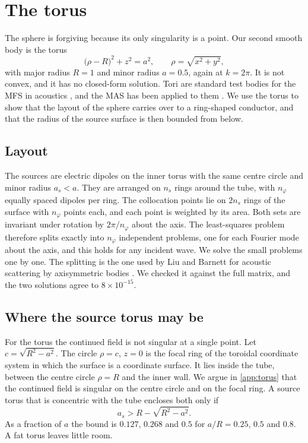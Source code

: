 \section{The torus}
\label{sec:torus}

The sphere is forgiving because its only singularity is a point. Our second smooth body is the torus
\begin{equation}
  \bigl(\rho - R\bigr)^2 + z^2 = a^2, \qquad \rho = \sqrt{x^2+y^2},
\end{equation}
with major radius $R = 1$ and minor radius $a = 0.5$, again at $k = 2\pi$. It is not convex, and it has no closed-form solution. Tori are standard test bodies for the MFS in acoustics \cite{cai2026}, and the MAS has been applied to them \cite{karkashadze1990s}. We use the torus to show that the layout of the sphere carries over to a ring-shaped conductor, and that the radius of the source surface is then bounded from below.

\subsection{Layout}

The sources are electric dipoles on the inner torus with the same centre circle and minor radius $a_s < a$. They are arranged on $n_s$ rings around the tube, with $n_\varphi$ equally spaced dipoles per ring. The collocation points lie on $2n_s$ rings of the surface with $n_\varphi$ points each, and each point is weighted by its area. Both sets are invariant under rotation by $2\pi/n_\varphi$ about the axis. The least-squares problem therefore splits exactly into $n_\varphi$ independent problems, one for each Fourier mode about the axis, and this holds for any incident wave. We solve the small problems one by one. The splitting is the one used by Liu and Barnett for acoustic scattering by axisymmetric bodies \cite{liu2016}. We checked it against the full matrix, and the two solutions agree to $8\times10^{-15}$.

\subsection{Where the source torus may be}

For the torus the continued field is not singular at a single point. Let $c = \sqrt{R^2-a^2}$. The circle $\rho = c$, $z = 0$ is the focal ring of the toroidal coordinate system in which the surface is a coordinate surface. It lies inside the tube, between the centre circle $\rho = R$ and the inner wall. We argue in \ref{app:torus} that the continued field is singular on the centre circle and on the focal ring. A source torus that is concentric with the tube encloses both only if
\begin{equation}
  a_s > R - \sqrt{R^2-a^2}.
  \label{eq:torusradius}
\end{equation}
As a fraction of $a$ the bound is $0.127$, $0.268$ and $0.5$ for $a/R = 0.25$, $0.5$ and $0.8$. A fat torus leaves little room.

